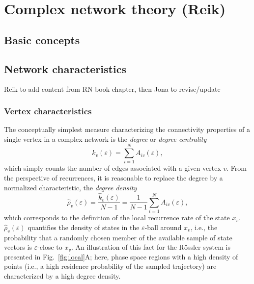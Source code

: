 \section{Complex network theory {\bf{(Reik)}}}
	\subsection{Basic concepts}

	\subsection{Network characteristics}
    Reik to add content from RN book chapter, then Jona to revise/update

		\subsubsection{Vertex characteristics}
        
The conceptually simplest measure characterizing the connectivity properties of a single vertex in a complex network is the \textit{degree} or \textit{degree centrality}
\begin{equation}
\hat{k}_v(\varepsilon)=\sum_{i=1}^N A_{iv}(\varepsilon),
\label{eq:degree}
\end{equation}
\noindent
which simply counts the number of edges associated with a given vertex $v$. From the perspective of recurrences, it is reasonable to replace the degree by a normalized characteristic, the \textit{degree density}
\begin{equation}
\hat{\rho}_v(\varepsilon)=\frac{\hat{k}_v(\varepsilon)}{N-1}=\frac{1}{N-1} \sum_{i=1}^N A_{iv}(\varepsilon),
\label{eq:locrho}
\end{equation}
\noindent
which corresponds to the definition of the local recurrence rate of the state $x_v$. $\hat{\rho}_v(\varepsilon)$ quantifies the density of states in the $\varepsilon$-ball around $x_v$, i.e., the probability that a randomly chosen member of the available sample of state vectors is $\varepsilon$-close to $x_v$. An illustration of this fact for the R\"ossler system is presented in Fig.~\ref{fig:local}A; here, phase space regions with a high density of points (i.e., a high residence probability of the sampled trajectory) are characterized by a high degree density.

